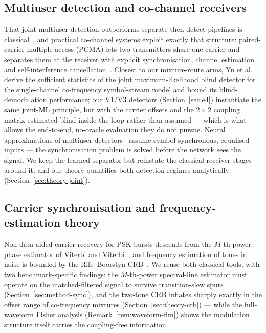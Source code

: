 \documentclass[journal]{IEEEtran}
\begin{document}
\subsection{Multiuser detection and co-channel receivers}

That joint multiuser detection outperforms separate-then-detect
pipelines is classical~\cite{verdu1998multiuser}, and practical
co-channel systems exploit exactly that structure: paired-carrier
multiple access (PCMA) lets two transmitters share one carrier and
separates them at the receiver with explicit synchronisation, channel
estimation and self-interference cancellation~\cite{dankberg1998pcma}.
Closest to our
mixture-route arms, Yu et al.~\cite{yu2024optimal} derive the
sufficient statistics of the joint maximum-likelihood blind detector
for the single-channel co-frequency symbol-stream model and bound its
blind-demodulation performance; our V1/V3 detectors
(Section~\ref{sec:e4}) instantiate the same joint-ML principle, but
with the carrier offsets and the $2 \times 2$ coupling matrix estimated
blind inside the loop rather than assumed --- which is what allows the
end-to-end, no-oracle evaluation they do not pursue. Neural
approximations of
multiuser detectors~\cite{samuel2019learning,farsad2018neural} assume
symbol-synchronous, equalised inputs --- the synchronisation problem is
solved before the network sees the signal. We keep the learned
separator but reinstate the classical receiver stages around it, and
our theory quantifies both detection regimes analytically
(Section~\ref{sec:theory-joint}).

\subsection{Carrier synchronisation and frequency-estimation theory}

Non-data-aided carrier recovery for PSK bursts descends from the
$M$-th-power phase estimator of Viterbi and
Viterbi~\cite{viterbi1983nonlinear}, and frequency estimation of tones
in noise is bounded by the Rife--Boorstyn CRB~\cite{rife1974single}.
We reuse both classical tools, with two benchmark-specific findings:
the $M$-th-power spectral-line estimator must operate on the
matched-filtered signal to survive transition-slew spurs
(Section~\ref{sec:method-sync}), and the two-tone CRB
inflates sharply exactly in the offset range of co-frequency
mixtures (Section~\ref{sec:theory-crb}) --- while the full-waveform
Fisher analysis (Remark~\ref{rem:waveform-fim}) shows the modulation
structure itself carries the coupling-free information.
\end{document}
